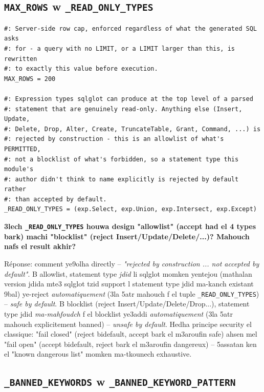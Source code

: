 \documentclass[11pt,a4paper]{report}
\DeclareRobustCommand{\code}[1]{\texttt{#1}}
\begin{document}
\subsection{\code{MAX\_ROWS} w \code{\_READ\_ONLY\_TYPES}}

\begin{lstlisting}[style=pystyle]
#: Server-side row cap, enforced regardless of what the generated SQL asks
#: for - a query with no LIMIT, or a LIMIT larger than this, is rewritten
#: to exactly this value before execution.
MAX_ROWS = 200

#: Expression types sqlglot can produce at the top level of a parsed
#: statement that are genuinely read-only. Anything else (Insert, Update,
#: Delete, Drop, Alter, Create, TruncateTable, Grant, Command, ...) is
#: rejected by construction - this is an allowlist of what's PERMITTED,
#: not a blocklist of what's forbidden, so a statement type this module's
#: author didn't think to name explicitly is rejected by default rather
#: than accepted by default.
_READ_ONLY_TYPES = (exp.Select, exp.Union, exp.Intersect, exp.Except)
\end{lstlisting}

\begin{soual}
\textbf{3lech \code{\_READ\_ONLY\_TYPES} houwa design "allowlist" (accept
had el 4 types bark) machi "blocklist" (reject Insert/Update/Delete/...)?
Mahouch nafs el result akhir?}

Réponse: comment ye9olha directly -- \emph{"rejected by construction ...
not accepted by default"}. B allowlist, statement type \emph{jdid} li
sqlglot momken yentejou (mathalan version jdida mte3 sqlglot tzid support
l statement type jdid ma-kanch existant 9bal) ye-reject \emph{automatiquement}
(3la 5atr mahouch f el tuple \code{\_READ\_ONLY\_TYPES}) -- \emph{safe by
default}. B blocklist (reject Insert/Update/Delete/Drop...), statement
type jdid \emph{ma-mahfoudch} f el blocklist ye3addi \emph{automatiquement}
(3la 5atr mahouch explicitement banned) -- \emph{unsafe by default}. Hedha
principe security el classique: "fail closed" (reject bidefault, accept
bark el m3aroufin safe) ahsen mel "fail open" (accept bidefault, reject
bark el m3aroufin dangereux) -- 5assatan ken el "known dangerous list"
momken ma-tkounech exhaustive.
\end{soual}

\subsection{\code{\_BANNED\_KEYWORDS} w \code{\_BANNED\_KEYWORD\_PATTERN}}
\end{document}
